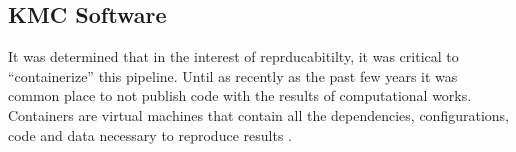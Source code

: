 \subsection{KMC Software}
\label{morphct}


It was determined
that in the interest of reprducabitilty, it was critical to ``containerize'' this pipeline. Until as recently as
the past few years it was common place to not publish code with the results of computational works. Containers
are virtual machines that contain all the dependencies, configurations, code and data necessary to reproduce
results \cite{Cito2016a}. 


